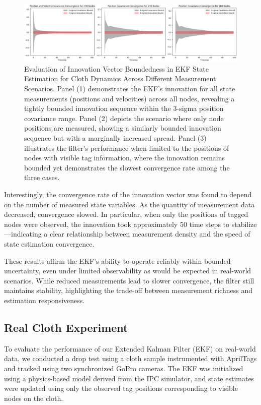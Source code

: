 \begin{figure}
\centering
\includegraphics[width=\textwidth]{Covariance Bound.png} %
\caption{Evaluation of Innovation Vector Boundedness in EKF State Estimation for Cloth Dynamics Across Different Measurement Scenarios. Panel (1) demonstrates the EKF's innovation for all state measurements (positions and velocities) across all nodes, revealing a tightly bounded innovation sequence within the 3-sigma position covariance range. Panel (2) depicts the scenario where only node positions are measured, showing a similarly bounded innovation sequence but with a marginally increased spread. Panel (3) illustrates the filter's performance when limited to the positions of nodes with visible tag information, where the innovation remains bounded yet demonstrates the slowest convergence rate among the three cases.}
\label{fig:covariance}
\end{figure}

Interestingly, the convergence rate of the innovation vector was found to depend on the number of measured state variables. As the quantity of measurement data decreased, convergence slowed. In particular, when only the positions of tagged nodes were observed, the innovation took approximately 50 time steps to stabilize—indicating a clear relationship between measurement density and the speed of state estimation convergence.

These results affirm the EKF's ability to operate reliably within bounded uncertainty, even under limited observability as would be expected in real-world scenarios. While reduced measurements lead to slower convergence, the filter still maintains stability, highlighting the trade-off between measurement richness and estimation responsiveness.

\subsection{Real Cloth Experiment}
To evaluate the performance of our Extended Kalman Filter (EKF) on real-world data, we conducted a drop test using a cloth sample instrumented with AprilTags and tracked using two synchronized GoPro cameras. The EKF was initialized using a physics-based model derived from the IPC simulator, and state estimates were updated using only the observed tag positions corresponding to visible nodes on the cloth.

